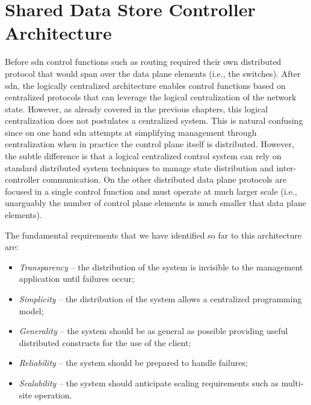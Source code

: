 
\section{Shared Data Store Controller Architecture} 
\glsresetall 


Before \gls{sdn} control functions such as routing required
their own distributed protocol that would span over the data plane
elements (i.e., the switches). 
After \gls{sdn},  the logically centralized architecture enables
control functions based on centralized protocols that can leverage
the logical centralization of the  network state.  
However, as already covered in the previous chapters, this logical
centralization does not postulates a centralized system. 
This is natural confusing since on one hand \gls{sdn} attempts at
simplifying management through centralization when in practice the
control plane itself is distributed. However, the subtle difference is
that a logical centralized control system can rely on standard
distributed system techniques to manage state distribution and
inter-controller communication. On the other distributed data plane
protocols are focused in a single control function and must operate at
much larger scale (i.e., unarguably the number of control plane
elements is much smaller that data plane elements). 

The fundamental requirements that we have identified so far to this
architecture are: 

\begin{itemize}
\item[] \emph{Transparency} -- the distribution of the system is invisible to the management application until failures occur;
\item[] \emph{Simplicity}  -- the distribution of the system allows a centralized programming model; 
\item[] \emph{Generality} -- the system should be as general as
  possible providing useful distributed constructs for the use of the client;
\item[] \emph{Reliability} -- the system should be prepared to handle   failures; 
\item[] \emph{Scalability} -- the system should anticipate scaling  requirements such as multi-site operation. 
\end{itemize}



